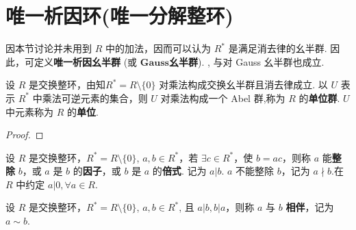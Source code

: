 \documentclass[../../main.tex]{subfiles}%
\begin{document}
\section{唯一析因环(唯一分解整环)}

因本节讨论并未用到 \( R \) 中的加法，因而可以认为 \( R^* \) 是满足消去律的幺半群. 因此，可定义\textbf{唯一析因幺半群} (或 $\mathbf{Gauss}$\textbf{幺半群}). , 与对 Gauss 幺半群也成立.

\begin{theorem}
设 \( R \) 是交换整环，由知\( R^* = R \setminus \{0\} \) 对乘法构成交换幺半群且消去律成立. 以 \( U \) 表示 \( R^* \) 中乘法可逆元素的集合，则 \( U \) 对乘法构成一个 Abel 群,称为 \( R \) 的\textbf{单位群}. \( U \) 中元素称为 \( R \) 的\textbf{单位}.
\end{theorem}
\begin{proof}

\end{proof}

\begin{definition}[整除]
设 \( R \) 是交换整环，\( R^* = R \setminus \{0\} \), \( a, b \in R^* \)，若 \( \exists c \in R^* \)，使 \( b = ac \)，则称 \( a \) 能\textbf{整除} \( b \)，或 \( a \) 是 \( b \) 的\textbf{因子}，或 \( b \) 是 \( a \) 的\textbf{倍式}. 记为 \( a|b \). \( a \) 不能整除 \( b \)，记为 \( a \nmid b \).在 \( R \) 中约定 \( a|0, \forall a \in R \). 
\end{definition}

\begin{definition}[相伴]
设 \( R \) 是交换整环，\( R^* = R \setminus \{0\} \), \( a, b \in R^* \), 且 \( a|b, b|a \)，则称 \( a \) 与 \( b \) \textbf{相伴}，记为 \( a \sim b \).
\end{definition}
\end{document}
